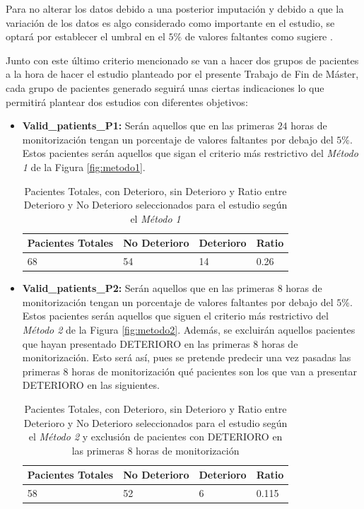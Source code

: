 Para no alterar los datos debido a una posterior imputación y debido a que la variación de los datos es algo considerado como importante en el estudio, se optará por establecer el umbral en el $5 \%$ de valores faltantes como sugiere \cite{Scheffer2002}. 

Junto con este último criterio mencionado se van a hacer dos grupos de pacientes a la hora de hacer el estudio planteado por el presente Trabajo de Fin de Máster, cada grupo de pacientes generado seguirá unas ciertas indicaciones lo que permitirá plantear dos estudios con diferentes objetivos:

\begin{itemize}
    \item \textbf{Valid\_patients\_P1:} Serán aquellos que en las primeras $24$ horas de monitorización tengan un porcentaje de valores faltantes por debajo del $5\%$. Estos pacientes serán aquellos que sigan el criterio más restrictivo del \textit{Método 1} de la Figura \ref{fig:metodo1}. 
    \begin{table}[H]
        \centering
        \begin{tabular}{|m{3cm}|m{2.25cm}|m{2cm}|m{2cm}|}
        \hline
            Pacientes Totales & No Deterioro & Deterioro & Ratio \\ \hline
            68 & 54 & 14 & 0.26 \\ \hline
        \end{tabular}
        \caption{Pacientes Totales, con Deterioro, sin Deterioro y Ratio entre Deterioro y No Deterioro seleccionados para el estudio según el \textit{Método 1}}\label{tabla:ratio-deterioro-P1}
    \end{table}
    \item \textbf{Valid\_patients\_P2:} Serán aquellos que en las primeras $8$ horas de monitorización tengan un porcentaje de valores faltantes por debajo del $5\%$. Estos pacientes serán aquellos que siguen el criterio más restrictivo del \textit{Método 2} de la Figura \ref{fig:metodo2}. Además, se excluirán aquellos pacientes que hayan presentado DETERIORO en las primeras $8$ horas de monitorización. Esto será así, pues se pretende predecir una vez pasadas las primeras $8$ horas de monitorización qué pacientes son los que van a presentar DETERIORO en las siguientes.
    \begin{table}[H]
        \centering
        \begin{tabular}{|m{3cm}|m{2.25cm}|m{2cm}|m{2cm}|}
        \hline
            Pacientes Totales & No Deterioro & Deterioro & Ratio \\ \hline
            58 & 52 & 6 & 0.115 \\ \hline
        \end{tabular}
        \caption{Pacientes Totales, con Deterioro, sin Deterioro y Ratio entre Deterioro y No Deterioro seleccionados para el estudio según el \textit{Método 2} y exclusión de pacientes con DETERIORO en las primeras 8 horas de monitorización}
            \label{tabla:ratio-deterioro-P1}
    \end{table}
\end{itemize}

